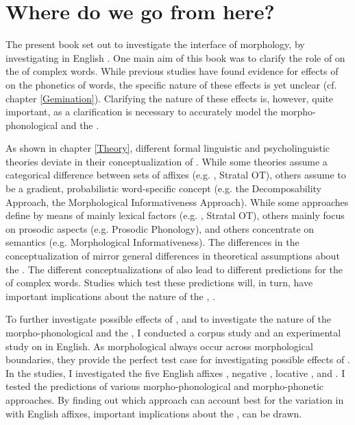 \chapter{Where do we go from here?} \label{final conclusion}

The present book set out to investigate the interface of morphology,  by investigating  in English . 
One main aim of this book was to clarify the role of  on the  of complex words. 
While previous studies have found evidence for effects of  on the phonetics of words, the specific nature of these effects is yet unclear (cf. chapter \ref{Gemination}). 
 Clarifying the nature of these effects is, however, quite important, as a clarification is necessary to accurately model the morpho-phonological and the . 

As shown in chapter \ref{Theory}, different formal linguistic and psycholinguistic theories deviate in their conceptualization of  . While some theories assume a categorical difference between sets of affixes (e.g. , Stratal OT), others assume  to be a gradient, probabilistic word-specific concept (e.g. the Decomposability Approach, the Morphological Informativeness Approach). 
While some approaches define  by means of mainly lexical factors (e.g. , Stratal OT), others mainly focus on prosodic aspects (e.g. Prosodic Phonology), and others concentrate on semantics (e.g. Morphological Informativeness).  The differences in the conceptualization of  mirror general differences in theoretical assumptions about the . %
 The different conceptualizations of  also lead to different predictions for the  of complex words.
 Studies which test these predictions will, in turn, have important implications about the nature of the , .
 
To further investigate possible effects of , and to investigate the nature of the morpho-phonological and the , I conducted a corpus study and an experimental study on  in English.  As morphological  always occur across morphological boundaries, they provide the perfect test case for investigating possible effects of . 
 In the studies, I investigated the five English affixes , negative , locative ,  and . I tested the predictions of various morpho-phonological and morpho-phonetic approaches. By finding out which approach can account best for the variation in  with English affixes, important implications about the ,  can be drawn.



